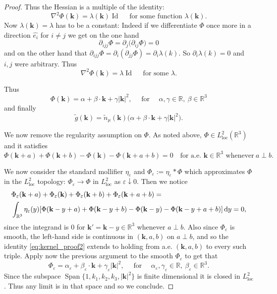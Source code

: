 \documentclass[reqno,11pt,letterpaper]{amsart}
\numberwithin{equation}{section}
\newcommand{\dd}{\, {\rm d}}
\begin{document}
\begin{proof}
Thus the Hessian is a multiple of the identity: 
$$\nabla^2 \Phi (\textbf{k}) = \lambda(\textbf{k}) \operatorname{Id} \quad \text{ for some function } \lambda(\textbf{k}). $$
Now $\lambda(\textbf{k})=\lambda$ has to be a constant: Indeed if we differentiate $\Phi$ once more in a direction $\hat{e_i}$ for $i\neq j$ we get on the one hand
$$ \partial_{ijj}\Phi = \partial_{j}\big(\partial_{ij}\Phi \big) =0 $$
and on the other hand that $\partial_{ijj}\Phi  = \partial_i( \partial_{jj}\Phi)  =\partial_i \lambda(k)$. So $\partial_i \lambda(k)=0$ and $i, j$ were arbitrary. Thus 
$$\nabla^2 \Phi (\textbf{k}) = \lambda \operatorname{Id} \quad \text{ for some } \lambda. $$

Thus $$\Phi(\textbf{k}) = \alpha + \beta  \cdot \textbf{k} + \gamma |\textbf{k}|^2,\quad \text{ for }\quad   \alpha, \gamma \in \mathbb{R},\ \beta \in \mathbb{R}^3 $$
and finally $$\widetilde g(\textbf{k})  = \widetilde n_\mu(\textbf{k}) \Big( \alpha + \beta \cdot \textbf{k} + \gamma |\textbf{k}|^2 \Big). $$

We now remove the regularity assumption on $\Phi$.  As noted above, $\Phi \in L^2_{\text{loc}}(\mathbb{R}^3)$ and it satisfies 
$$
\Phi(\textbf{k}+a)+ \Phi(\textbf{k}+b) - \Phi(\textbf{k}) - \Phi(\textbf{k}+a+b)=0 \quad \text{for a.e. } \textbf{k} \in \mathbb{R}^3 \text{ whenever} \ a\perp b. 
$$

We now consider the standard mollifier $\eta_\varepsilon$ and $\Phi_\varepsilon:= \eta_\varepsilon \ast \Phi$ which approximates $\Phi$ in the $L^2_{\text{loc}}$ topology: $\Phi_\varepsilon \to \Phi$ in $L^2_{\text{loc}}$ as $\varepsilon \downarrow 0$. Then we notice 
\begin{equation} \label{eq:kernel_proof2}
    \begin{split}
        & \Phi_\varepsilon(\textbf{k}+a)  + \Phi_\varepsilon(\textbf{k}) + \Phi_\varepsilon(\textbf{k}+b) + \Phi_\varepsilon(\textbf{k}+a+b)  = \\
  & \int_{\mathbb{R}^3} \eta_\varepsilon(y) [\Phi(\textbf{k}-y+a)+ \Phi(\textbf{k}-y+b) - \Phi(\textbf{k}-y) - \Phi(\textbf{k}-y+a+b)] \dd y=0,
    \end{split}
\end{equation}
since the integrand is $0$ for $\textbf{k}'=\textbf{k}-y \in \mathbb{R}^3$ whenever $a\perp b$. Also since $\Phi_\varepsilon$ is smooth, the left-hand side is continuous in $(\textbf{k},a,b)$ on $a\perp b$, and so the identity \eqref{eq:kernel_proof2} extends to holding from a.e. $(\textbf{k},a,b)$ to every such triple. 
Apply now the previous argument to the smooth $\Phi_\varepsilon$ to get that 
$$ \Phi_\varepsilon = \alpha_{\varepsilon} + \beta_{\varepsilon} \cdot \textbf{k} + \gamma_{\varepsilon} |\textbf{k}|^2, \quad \text{ for } \quad \alpha_{\varepsilon},  \gamma_{\varepsilon}\in \mathbb{R},\ \beta_{\varepsilon}\in \mathbb{R}^3. $$
Since the subspace
 $\operatorname{Span}\{1, k_1, k_2, k_3, |\textbf{k}|^2\}$  is finite dimensional it is closed in $L^2_{\text{loc}}$. Thus any limit is in that space and so we conclude. 
 

\end{proof}
\end{document}
